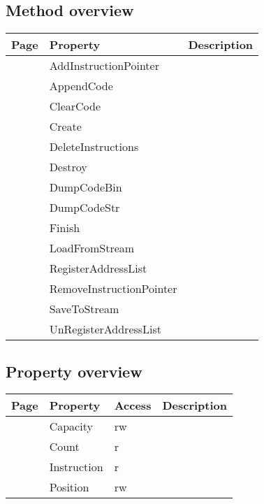 \subsection{Method overview}
\label{thoriumcore:thorium:tthoriuminstructions:methods}
\begin{tabularx}{\textwidth}{llX}
Page & Property & Description  \\ \hline
\pageref{thoriumcore:thorium:tthoriuminstructions:addinstructionpointer} & AddInstructionPointer  &  \\
\pageref{thoriumcore:thorium:tthoriuminstructions:appendcode} & AppendCode  &  \\
\pageref{thoriumcore:thorium:tthoriuminstructions:clearcode} & ClearCode  &  \\
\pageref{thoriumcore:thorium:tthoriuminstructions:create} & Create  &  \\
\pageref{thoriumcore:thorium:tthoriuminstructions:deleteinstructions} & DeleteInstructions  &  \\
\pageref{thoriumcore:thorium:tthoriuminstructions:destroy} & Destroy  &  \\
\pageref{thoriumcore:thorium:tthoriuminstructions:dumpcodebin} & DumpCodeBin  &  \\
\pageref{thoriumcore:thorium:tthoriuminstructions:dumpcodestr} & DumpCodeStr  &  \\
\pageref{thoriumcore:thorium:tthoriuminstructions:finish} & Finish  &  \\
\pageref{thoriumcore:thorium:tthoriuminstructions:loadfromstream} & LoadFromStream  &  \\
\pageref{thoriumcore:thorium:tthoriuminstructions:registeraddresslist} & RegisterAddressList  &  \\
\pageref{thoriumcore:thorium:tthoriuminstructions:removeinstructionpointer} & RemoveInstructionPointer  &  \\
\pageref{thoriumcore:thorium:tthoriuminstructions:savetostream} & SaveToStream  &  \\
\pageref{thoriumcore:thorium:tthoriuminstructions:unregisteraddresslist} & UnRegisterAddressList  &  \\
\hline
\end{tabularx}
\subsection{Property overview}
\label{thoriumcore:thorium:tthoriuminstructions:properties}
\begin{tabularx}{\textwidth}{lllX}
Page & Property & Access & Description \\ \hline
\pageref{thoriumcore:thorium:tthoriuminstructions:capacity} & Capacity & rw &  \\
\pageref{thoriumcore:thorium:tthoriuminstructions:count} & Count & r &  \\
\pageref{thoriumcore:thorium:tthoriuminstructions:instruction} & Instruction & r &  \\
\pageref{thoriumcore:thorium:tthoriuminstructions:position} & Position & rw &  \\
\hline
\end{tabularx}

